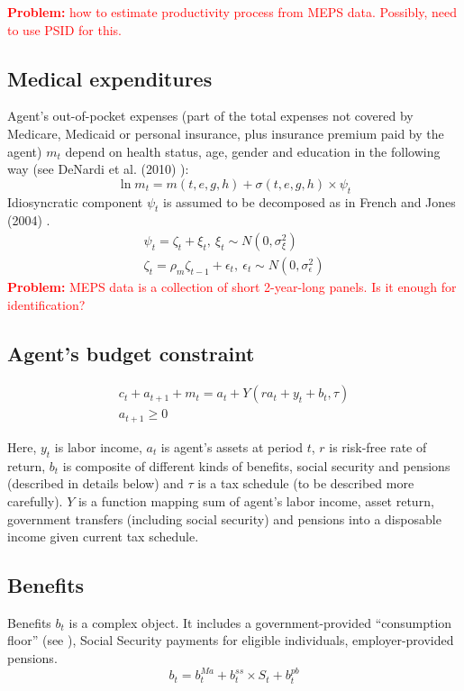 \documentclass[
10pt, %
a4paper, %
oneside, %
headinclude,footinclude, %
BCOR5mm, %
]{scrartcl}
\begin{document}
 \textcolor{red}{\textbf{Problem:} how to estimate productivity process from MEPS data. Possibly, need to use PSID for this.}

\subsection{Medical expenditures}
Agent's out-of-pocket expenses (part of the total expenses not covered by Medicare, Medicaid or personal insurance, plus insurance premium paid by the agent) $m_t$ depend on health status, age, gender and education in the following way (see DeNardi et al. (2010) \cite{DeNardi2010}):
\begin{equation*}
\ln m_t = m(t,e,g,h) + \sigma(t,e,g,h)\times \psi_t 
\end{equation*}
Idiosyncratic component $\psi_t$ is assumed to be decomposed as in French and Jones (2004) \cite{French2004}.
\begin{eqnarray*}
\psi_t = \zeta_t + \xi_t, \   	\xi_t \sim N(0,\sigma_\xi^2) \\
\zeta_t = \rho_m\zeta_{t-1} + \epsilon_t, \   \epsilon_t \sim N(0,\sigma_\epsilon^2)
\end{eqnarray*}
 \textcolor{red}{\textbf{Problem:} MEPS data is a collection of short 2-year-long panels. Is it enough for identification?}

\subsection{Agent's budget constraint}

\begin{eqnarray*}
c_t + a_{t+1} +m_t = a_t+Y(ra_t+y_t+b_t,\tau)  \\
a_{t+1}\ge0
\end{eqnarray*}

Here, $y_t$ is labor income, $a_t$ is agent's assets at period $t$, $r$ is risk-free rate of return, $b_t$ is composite of different kinds of benefits, social security and pensions (described in details below) and $\tau$ is a tax schedule (to be described more carefully).  $Y$ is a function mapping sum of agent's labor income, asset return, government transfers (including social security) and pensions into a disposable income given current tax schedule.

\subsection{Benefits}
Benefits $b_t$ is a complex object. It includes a government-provided ``consumption floor'' (see \cite{DeNardi2010}), Social Security payments for eligible individuals, employer-provided pensions.
\begin{equation*}
b_t = b_t^{Ma} + b_t^{ss}\times S_t+b_t^{pb}
\end{equation*}
\end{document}
